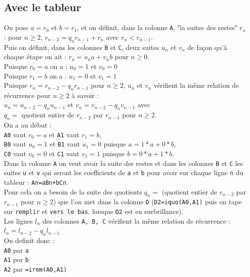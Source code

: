 \documentclass[a4paper,11pt]{book}
\begin{document}
\subsection{Avec le tableur}
On pose $a=r_0$ et $b=r_1$, et on  d\'efinit, dans la colonne {\tt A}, "la 
suites des restes" $r_n$ :
pour $n \geq 2$, $r_{n-2}=q_nr_{n-1}+r_n$ avec $r_n<r_{n-1}$.\\
Puis on d\'efinit, dans les colonnes {\tt B} et {\tt C}, deux suites $u_n$ et $v_n$  de 
fa\c{c}on qu'\`a chaque \'etape on ait :
$r_n=u_na+v_nb$ pour $n \geq 0$.\\
Puisque $r_0=a$ on a : $u_0=1$ et $v_0=0$\\
Puisque $r_1=b$ on a : $u_1=0$ et $v_1=1$\\
Puisque $r_n=r_{n-2}-q_nr_{n-1}$ pour $n \geq 2$,
$u_n$ et $v_n$  v\'erifient la m\^eme relation de 
r\'ecurrence pour $n \geq 2$ \`a savoir :\\
 $u_n=u_{n-2}-q_nu_{n-1} $ et $v_n=v_{n-2}-q_nv_{n-1} $ avec\\
$q_n=$ quotient entier de $r_{n-2}$ par $r_{n-1}$ pour $n \geq 2$.\\
On a au d\'ebut :\\
{\tt A0} vaut $r_0=a$ et {\tt A1} vaut $r_1=b$,\\
{\tt B0} vaut $u_0=1$ et {\tt B1} vaut $u_1=0$ puisque $a=1*a+0*b$,\\
{\tt C0} vaut $v_0=0$ et {\tt C1} vaut $v_1=1$ puisque $b=0*a+1*b$.\\
Dans la colonne {\tt A} on veut avoir la suite 
 des restes et dans les colonnes {\tt B} et {\tt C}
les suites {\tt u} et {\tt v} qui seront les coefficients de {\tt a} et {\tt b} pour avoir sur chaque ligne {\tt n} du tableur :
 {\tt An=aBn+bCn}.\\
Pour cela on a besoin de la suite des quotients $q_n=$ (quotient entier de 
$r_{n-2}$ par $r_{n-1}$ pour $n \geq 2$) que l'on met dans la colonne
 {\tt D} ({\tt D2=iquo(A0,A1)} puis on tape sur {\tt remplir}
et {\tt vers le bas}, lorsque 
{\tt D2} est en surbrillance).\\
Les lignes $l_n$ des colonnes {\tt A, B, C} v\'erifient la m\^eme relation de 
r\'ecurrence :\\
$l_n=l_{n-2}-q_nl_{n-1} $\\
On definit donc :\\
{\tt A0} par {\tt a }\\ 
{\tt A1} par {\tt b} \\
{\tt A2} par {\tt =irem(A0,A1)}\\
\end{document}
